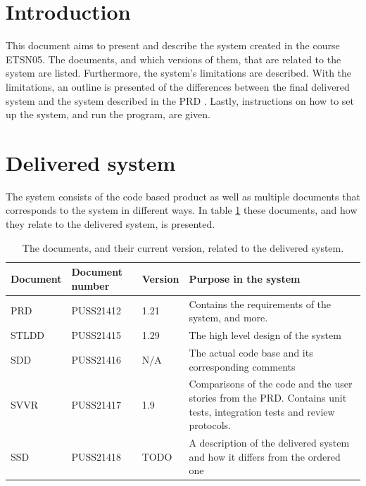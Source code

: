 \documentclass{article}
\begin{document}
\section{Introduction}\label{sec:intro} %
This document aims to present and describe the system created in the course ETSN05. The documents, and which versions of them, that are related to the system are listed. Furthermore, the system's limitations are described. With the limitations, an outline is presented of the differences between the final delivered system and the system described in the PRD \cite{PRD}. Lastly, instructions on how to set up the system, and run the program, are given. 

\section{Delivered system} %


The system consists of the code based product as well as multiple documents that corresponds to the system in different ways. In table \ref{tab:deliveredSys} these documents, and how they relate to the delivered system, is presented. 

\begin{table}[h]
    \centering
    \begin{tabular}{|l|l|l|p{90mm}|}
    \hline
    Document & Document number & Version & Purpose in the system \\
    \hline \hline
    PRD & PUSS21412 & 1.21 & Contains the requirements of the system, and more. \\ \hline
    STLDD & PUSS21415 & 1.29 & The high level design of the system \\ \hline 
    SDD & PUSS21416 & N/A & The actual code base and its corresponding comments \\ \hline
    SVVR & PUSS21417 & 1.9 & Comparisons of the code and the user stories from the PRD. Contains unit tests, integration tests and review protocols. \\ \hline
    SSD & PUSS21418 & TODO & A description of the delivered system and how it differs from the ordered one \\ \hline
    \end{tabular}
    \caption{The documents, and their current version, related to the delivered system.}
    \label{tab:deliveredSys}
\end{table}
\end{document}
